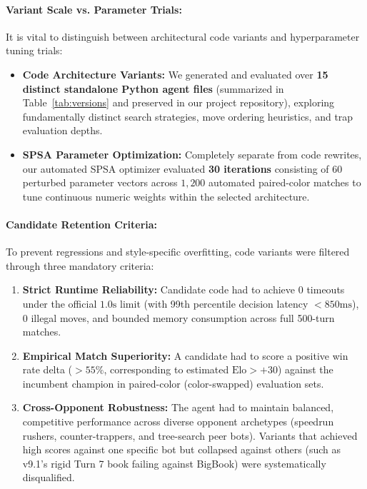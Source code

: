 \paragraph{Variant Scale vs. Parameter Trials:} It is vital to distinguish between architectural code variants and hyperparameter tuning trials:
\begin{itemize}[leftmargin=1.5em]
    \item \textbf{Code Architecture Variants:} We generated and evaluated over \textbf{15 distinct standalone Python agent files} (summarized in Table~\ref{tab:versions} and preserved in our project repository), exploring fundamentally distinct search strategies, move ordering heuristics, and trap evaluation depths.
    \item \textbf{SPSA Parameter Optimization:} Completely separate from code rewrites, our automated SPSA optimizer evaluated \textbf{30 iterations} consisting of $60$ perturbed parameter vectors across $1{,}200$ automated paired-color matches to tune continuous numeric weights within the selected architecture.
\end{itemize}

\paragraph{Candidate Retention Criteria:} To prevent regressions and style-specific overfitting, code variants were filtered through three mandatory criteria:
\begin{enumerate}[leftmargin=1.5em]
    \item \textbf{Strict Runtime Reliability:} Candidate code had to achieve $0$ timeouts under the official $1.0\text{s}$ limit (with 99th percentile decision latency $< 850\text{ms}$), $0$ illegal moves, and bounded memory consumption across full 500-turn matches.
    \item \textbf{Empirical Match Superiority:} A candidate had to score a positive win rate delta ($> 55\%$, corresponding to estimated $\text{Elo} > +30$) against the incumbent champion in paired-color (color-swapped) evaluation sets.
    \item \textbf{Cross-Opponent Robustness:} The agent had to maintain balanced, competitive performance across diverse opponent archetypes (speedrun rushers, counter-trappers, and tree-search peer bots). Variants that achieved high scores against one specific bot but collapsed against others (such as v9.1's rigid Turn 7 book failing against BigBook) were systematically disqualified.
\end{enumerate}

